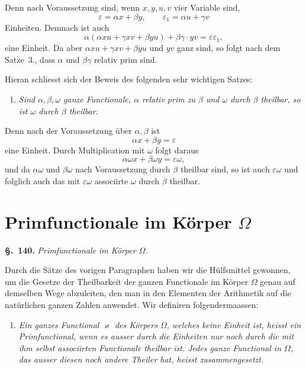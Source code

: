 \documentclass[12pt,a4paper]{article}
\theoremstyle{definition}
\begin{document}
Denn nach Voraussetzung sind, wenn $x,y,u,v$ vier Variable sind,
\[
\varepsilon = \alpha x + \beta y,\qquad \varepsilon_1 = \alpha u + \gamma v
\]
Einheiten. Demnach ist auch
\[
\alpha(\alpha xu + \gamma xv + \beta yu) + \beta\gamma\cdot yv = \varepsilon\varepsilon_1,
\]
eine Einheit. Da aber $\alpha xu+\gamma xv+\beta yu$ und $yv$ ganz sind, so folgt nach dem Satze~3., dass $\alpha$ und $\beta\gamma$ relativ prim sind.

Hieran schliesst sich der Beweis des folgenden sehr wichtigen Satzes:

\begin{enumerate}[label=\arabic*., resume]
\item \textit{Sind $\alpha,\beta,\omega$ ganze Functionale, $\alpha$ relativ prim zu $\beta$ und $\omega$ durch $\beta$ theilbar, so ist $\omega$ durch $\beta$ theilbar.}
\end{enumerate}

Denn nach der Voraussetzung über $\alpha,\beta$ ist
\[
\alpha x + \beta y = \varepsilon
\]
eine Einheit. Durch Multiplication mit $\omega$ folgt daraus
\[
\alpha\omega x + \beta\omega y = \varepsilon\omega,
\]
und da $\alpha\omega$ und $\beta\omega$ nach Voraussetzung durch $\beta$ theilbar sind, so ist auch $\varepsilon\omega$ und folglich auch das mit $\varepsilon\omega$ associirte $\omega$ durch $\beta$ theilbar.

\newpage
\section{Primfunctionale im Körper $\Omega$}\label{sec:140}

\noindent\textbf{\S.~140.}\quad
\textit{Primfunctionale im Körper $\Omega$.}\par\medskip

Durch die Sätze des vorigen Paragraphen haben wir die Hülfsmittel gewonnen, um die Gesetze der Theilbarkeit der ganzen Functionale im Körper $\Omega$ genau auf demselben Wege abzuleiten, den man in den Elementen der Arithmetik auf die natürlichen ganzen Zahlen anwendet. Wir definiren folgendermaassen:

\begin{enumerate}[label=\arabic*.]
\item \textit{Ein ganzes Functional $\varkappa$ des Körpers $\Omega$, welches keine Einheit ist, heisst ein \emph{Primfunctional}, wenn es ausser durch die Einheiten nur noch durch die mit ihm selbst associirten Functionale theilbar ist. Jedes ganze Functional in $\Omega$, das ausser diesen noch andere Theiler hat, heisst \emph{zusammengesetzt}.}
\end{enumerate}
\end{document}
